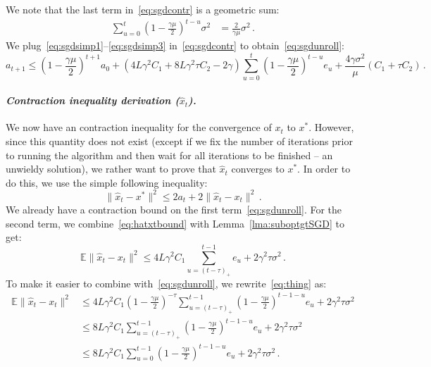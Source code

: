\documentclass[twoside, 11pt]{article}
\newcommand{\stepsize}{\gamma}
\newcommand{\strongconvex}{\mu}
\newcommand{\overlap}{\tau}
\newcommand{\lipschitz}{L}
\newcommand{\E}{\mathbb{E}}
\begin{document}
We note that the last term in~\eqref{eq:sgdcontr} is a geometric sum:
\begin{align}\label{eq:sgdsimp3}
\sum_{u = 0}^{t} (1 - \frac{\stepsize\strongconvex}{2})^{t-u} \sigma^2
&= \frac{2}{\stepsize \strongconvex} \sigma^2 \,.
\end{align}
We plug~\eqref{eq:sgdsimp1}--\eqref{eq:sgdsimp3} in~\eqref{eq:sgdcontr} to obtain~\eqref{eq:sgdunroll}:
\begin{equation*}
a_{t+1} \leq (1 - \frac{\stepsize \strongconvex}{2})^{t+1} a_{0}
+ (4\lipschitz \stepsize^2 C_1 + 8\lipschitz \stepsize^2 \overlap C_2 -2\stepsize) \sum_{u=0}^{t} (1 - \frac{\stepsize \strongconvex}{2})^{t -u} e_u
+ \frac{4 \stepsize \sigma^2}{\strongconvex} ( C_1 + \overlap C_2) \,.
\end{equation*}

\paragraph{\textit{Contraction inequality derivation ($\hat x_t$).}}
We now have an contraction inequality for the convergence of $x_t$ to $x^*$.
However, since this quantity does not exist (except if we fix the number of iterations prior to running the algorithm and then wait for all iterations to be finished -- an unwieldy solution), we rather want to prove that $\hat x_t$ converges to $x^*$.
In order to do this, we use the simple following inequality:
\begin{equation}
\|\hat x_t - x^*\|^2 \leq 2 a_t + 2\|\hat x_t - x_t\|^2\,.
\end{equation}
We already have a contraction bound on the first term~\eqref{eq:sgdunroll}.
For the second term, we combine~\eqref{eq:hatxtbound} with Lemma~\ref{lma:suboptgtSGD} to get:
\begin{equation}\label{eq:thing}
\E \|\hat x_t - x_t\|^2
\leq
4 \lipschitz \stepsize^2 C_1 \sum_{u = (t - \overlap)_+}^{t-1} e_u + 2\stepsize^2 \overlap \sigma^2\,.
\end{equation}
To make it easier to combine with~\eqref{eq:sgdunroll}, we rewrite~\eqref{eq:thing} as:
\begin{equation}\label{eq:xhatxt}
\begin{aligned}
\E \|\hat x_t - x_t\|^2
&\leq
4 \lipschitz \stepsize^2 C_1 (1 - \frac{\stepsize \strongconvex}{2})^{-\overlap} \sum_{u = (t - \overlap)_+}^{t-1} (1 - \frac{\stepsize \strongconvex}{2})^{t-1-u} e_u + 2\stepsize^2 \overlap \sigma^2
\\
&\leq
8 \lipschitz \stepsize^2 C_1 \sum_{u = (t - \overlap)_+}^{t-1} (1 - \frac{\stepsize \strongconvex}{2})^{t-1-u} e_u + 2\stepsize^2 \overlap \sigma^2
\\
&\leq
8 \lipschitz \stepsize^2 C_1 \sum_{u = 0}^{t-1} (1 - \frac{\stepsize \strongconvex}{2})^{t-1-u} e_u + 2\stepsize^2 \overlap \sigma^2\,.
\end{aligned}
\end{equation}
\end{document}
